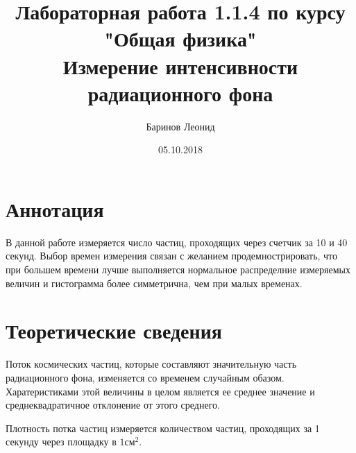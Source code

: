 \documentclass[a4paper,12pt]{article} %
\title{Лабораторная работа 1.1.4 по курсу \\ "Общая физика"  \\ 
\vspace{0.2cm}
\vspace{4.5cm}
 \LARGE{\textbf{Измерение интенсивности радиационного фона}}\vspace{5.5cm}}
\date{05.10.2018}
\author{\vspace{0.2cm}Баринов Леонид}
\begin{document}
\maketitle
\newpage
\section{Аннотация}
В данной работе измеряется число частиц, проходящих через счетчик за 10 и 40 секунд. Выбор времен измерения связан с желанием продемнострировать, что при большем времени лучше выполняется нормальное распределние измеряемых величин и гистограмма более симметрична, чем при малых временах.
\section{Теоретические сведения}
Поток космических частиц, которые составляют значительную часть радиационного фона, изменяется со временем случайным обазом. Харатеристиками этой величины в целом является ее среднее значение и среднеквадратичное отклонение от этого среднего.

Плотность потка частиц измеряется количеством частиц, проходящих за 1 секунду через площадку в $1\text{см}^2$. 
\end{document}
